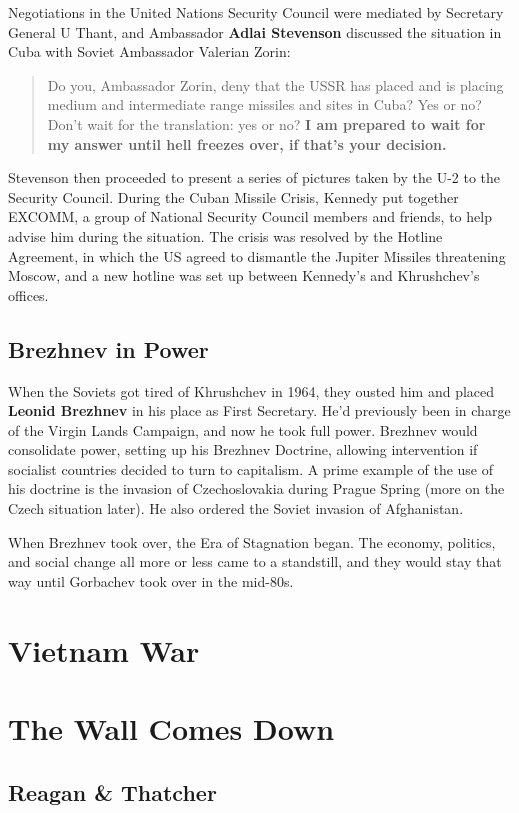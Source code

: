 Negotiations in the United Nations Security Council were mediated by Secretary General U Thant,
and Ambassador \textbf{Adlai Stevenson} discussed the situation in Cuba with Soviet Ambassador Valerian Zorin:
\begin{quote}
  Do you, Ambassador Zorin, deny that the USSR has placed
  and is placing medium and intermediate range missiles and sites in Cuba?
  Yes or no?
  Don't wait for the translation: yes or no?
  \textbf{I am prepared to wait for my answer until hell freezes over, if that's your decision.}
\end{quote}
Stevenson then proceeded to present a series of pictures taken by the U-2 to the Security Council.
During the Cuban Missile Crisis, Kennedy put together EXCOMM,
a group of National Security Council members and friends, to help advise him during the situation.
The crisis was resolved by the Hotline Agreement,
in which the US agreed to dismantle the Jupiter Missiles threatening Moscow,
and a new hotline was set up between Kennedy's and Khrushchev's offices.

\subsection*{Brezhnev in Power}

When the Soviets got tired of Khrushchev in 1964,
they ousted him and placed \textbf{Leonid Brezhnev} in his place as First Secretary.
He'd previously been in charge of the Virgin Lands Campaign, and now he took full power.
Brezhnev would consolidate power, setting up his Brezhnev Doctrine,
allowing intervention if socialist countries decided to turn to capitalism.
A prime example of the use of his doctrine is the invasion of Czechoslovakia during Prague Spring
(more on the Czech situation later).
He also ordered the Soviet invasion of Afghanistan.

When Brezhnev took over, the Era of Stagnation began.
The economy, politics, and social change all more or less came to a standstill,
and they would stay that way until Gorbachev took over in the mid-80s.

\section{Vietnam War}

\section{The Wall Comes Down}

\subsection*{Reagan \& Thatcher}


